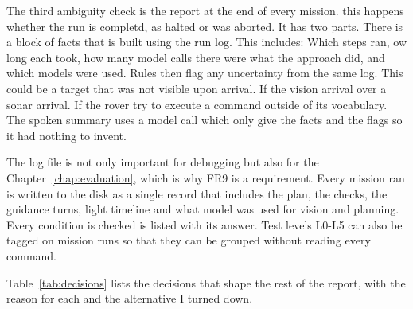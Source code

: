 \label{sec:report}

The third ambiguity check is the report at the end of every mission. this happens whether the run is completd, as halted or was aborted. It has two parts. 
There is a block of facts that is built using the run log. This includes: Which steps ran, ow long each took, how many model calls there were what the approach did, and 
which models were used. Rules then flag any uncertainty from the same log. This could be a target that was not visible upon arrival. If the vision arrival over a sonar arrival.
If the rover try to execute a command outside of its vocabulary. The spoken summary uses a model call which only give the facts and the flags so it had nothing to invent.

The log file is not only important for debugging but also for the Chapter~\ref{chap:evaluation}, which is why FR9 is a requirement. Every mission ran is written to the disk as a single
record that includes the plan, the checks, the guidance turns, light timeline and what model was used for vision and planning. Every condition is checked is listed with its answer. Test levels L0-L5
can also be tagged on mission runs so that they can be grouped without reading every command.

\label{sec:design_decisions}



Table~\ref{tab:decisions} lists the decisions that shape the rest of the report,
with the reason for each and the alternative I turned down.

